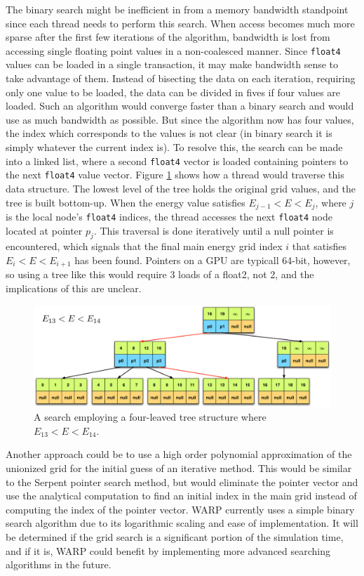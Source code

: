 The binary search might be inefficient in from a memory bandwidth standpoint since each thread needs to perform this search.  When access becomes much more sparse after the first few iterations of the algorithm, bandwidth is lost from accessing single floating point values in a non-coalesced manner.  Since \lstinline{float4} values can be loaded in a single transaction, it may make bandwidth sense to take advantage of them.  Instead of bisecting the data on each iteration, requiring only one value to be loaded, the data can be divided in fives if four values are loaded.  Such an algorithm would converge faster than a binary search and would use as much bandwidth as possible.  But since the algorithm now has four values, the index which corresponds to the values is not clear (in binary search it is simply whatever the current index is).  To resolve this, the search can be made into a linked list, where a second \lstinline{float4} vector is loaded containing pointers to the next \lstinline{float4} value vector.  Figure \ref{quad_tree} shows how a thread would traverse this data structure.  The lowest level of the tree holds the original grid values, and the tree is built bottom-up.  When the energy value satisfies $E_{j-1}<E<E_{j}$, where $j$ is the local node's \lstinline{float4} indices, the thread accesses the next \lstinline{float4} node located at pointer $p_j$.  This traversal is done iteratively until a null pointer is encountered, which signals that the final main energy grid index $i$ that satisfies $E_{i}<E<E_{i+1}$ has been found.  Pointers on a GPU are typicall 64-bit, however, so using a tree like this would require 3 loads of a float2, not 2, and the implications of this are unclear.

\begin{figure}[h!] 
\centering
\includegraphics[width=1.0\textwidth]{graphics/quad_tree.eps}
\caption{A search employing a four-leaved tree structure where $E_{13}<E<E_{14}$. \label{quad_tree} }
\end{figure}

Another approach could be to use a high order polynomial approximation of the unionized grid for the initial guess of an iterative method.  This would be similar to the Serpent pointer search method, but would eliminate the pointer vector and use the analytical computation to find an initial index in the main grid instead of computing the index of the pointer vector.  WARP currently uses a simple binary search algorithm due to its logarithmic scaling and ease of implementation.  It will be determined if the grid search is a significant portion of the simulation time, and if it is, WARP could benefit by implementing more advanced searching algorithms in the future.

